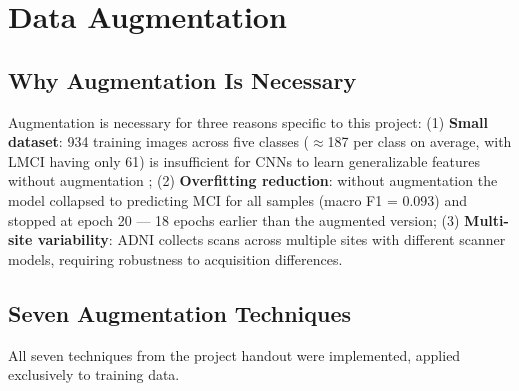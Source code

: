 \documentclass[12pt, a4paper]{article}
\begin{document}
\section{Data Augmentation}

\subsection{Why Augmentation Is Necessary}

Augmentation is necessary for three reasons specific to
this project: (1) \textbf{Small dataset}: 934 training
images across five classes ($\approx$187 per class on
average, with LMCI having only 61) is insufficient for
CNNs to learn generalizable features without augmentation
\cite{lim2022}; (2) \textbf{Overfitting reduction}:
without augmentation the model collapsed to predicting
MCI for all samples (macro F1 = 0.093) and stopped at
epoch 20 --- 18 epochs earlier than the augmented version;
(3) \textbf{Multi-site variability}: ADNI collects scans
across multiple sites with different scanner models,
requiring robustness to acquisition differences.

\subsection{Seven Augmentation Techniques}

All seven techniques from the project handout were
implemented, applied exclusively to training data.
\end{document}
